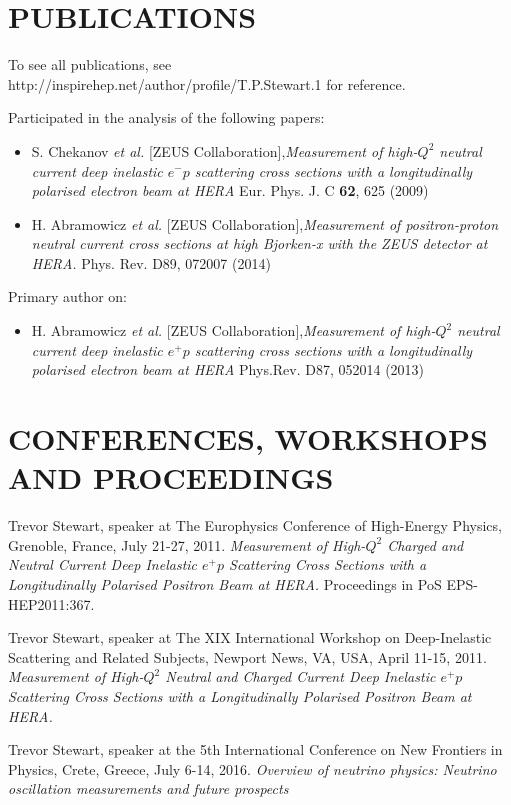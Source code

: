 \documentclass[margin]{res}
\begin{document}
\begin{resume}
\section{PUBLICATIONS}

To see all publications, see \\http://inspirehep.net/author/profile/T.P.Stewart.1 
for reference.

Participated in the analysis of the following papers:
\begin{itemize}
\item  S. Chekanov {\it et al.}  [ZEUS Collaboration],\textit{Measurement of high-$Q^2$ neutral current deep inelastic $e^- p$ scattering cross sections with a longitudinally polarised electron beam at HERA} Eur. Phys. J. C {\bf 62}, 625 (2009)
\item H. Abramowicz {\it et al.} [ZEUS Collaboration],\textit{Measurement of positron-proton neutral current cross sections at high Bjorken-x with the ZEUS detector at HERA.} Phys. Rev. D89, 072007 (2014)
\end{itemize}

Primary author on:
\begin{itemize}
\item H. Abramowicz {\it et al.} [ZEUS Collaboration],\textit{Measurement of high-$Q^2$ neutral current deep inelastic $e^+ p$ scattering cross sections with a longitudinally polarised electron beam at HERA} Phys.Rev. D87, 052014 (2013)
\end{itemize}

\section{CONFERENCES, WORKSHOPS AND PROCEEDINGS}

Trevor Stewart, speaker at The Europhysics Conference of High-Energy Physics, Grenoble, France, July 21-27, 2011. \textit{Measurement of High-$Q^2$ Charged and Neutral Current Deep Inelastic $e^{+}p$ Scattering Cross Sections with a Longitudinally Polarised Positron Beam at HERA.} Proceedings in PoS EPS-HEP2011:367.

Trevor Stewart, speaker at The XIX International Workshop on Deep-Inelastic Scattering and Related Subjects, Newport News, VA, USA, April 11-15, 2011. \textit{Measurement of High-$Q^2$ Neutral and Charged Current Deep Inelastic $e^+p$ Scattering Cross Sections with a Longitudinally Polarised Positron Beam at HERA.}

Trevor Stewart, speaker at the 5th International Conference on New Frontiers in Physics, Crete, Greece, July 6-14, 2016. \textit{Overview of neutrino physics: Neutrino oscillation measurements and future prospects}


\end{resume}
\end{document}
